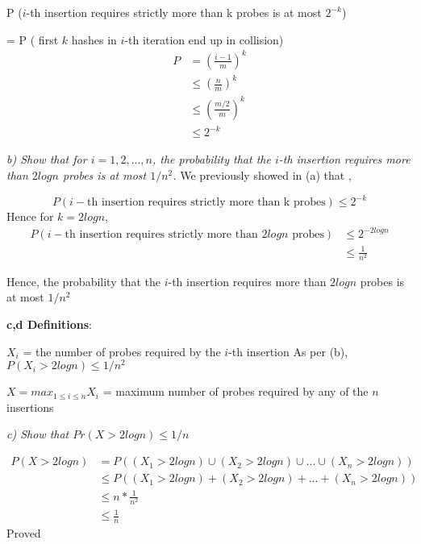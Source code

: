 \documentclass{homeworg}
\begin{document}
P ($i$-th insertion requires strictly more than k probes is at most $2^{-k}$)

= P ( first $k$ hashes in $i$-th iteration end up in collision)
\begin{align*}
P &=\left(\frac{i-1}{m}\right)^k\\
&\le \left(\frac{n}{m}\right)^k\\
&\le \left(\frac{m/2}{m}\right)^k\\
&\le 2^{-k}
\end{align*}

\emph{b) Show that for $i =1, 2,. .., n$, the probability that the $i$-th insertion requires more than $2 log n$ probes is at most $1/n^2$.}
We previously showed in (a) that ,

$$P (i-\text{th insertion requires strictly more than k probes}) \le 2^{-k}$$
Hence for $k = 2 log n$,
\begin{align*}
    P (i-\text{th insertion requires strictly more than $2 log n $ probes})&\le 2^{-2 logn}\\
    &\le \frac{1}{n^2} 
\end{align*}

Hence, the probability that the $i$-th insertion requires more than $2 log n$ probes is at most $1/n^2$


\textbf{c,d Definitions}:

$X_i$ = the number of probes required by the $i$-th insertion
As per (b), $P({X_i > 2 log n}) \le 1/n^2$ 

$X = max_{1\le i\le n} X_i$ = maximum number of probes required by any of the $n$ insertions

\emph{c) Show that $Pr({X> 2 log n}) \le 1/n$}

\begin{align*}
    P({X> 2 log n}) &= P((X_1> 2 log n) \cup (X_2> 2 log n) \cup... \cup (X_n> 2 log n)) \\
    &\le P((X_1> 2 log n) + (X_2> 2 log n) +... + (X_n> 2 log n)) \\
    &\le n \ast  \frac{1}{n^2} \\
    &\le \frac{1}{n} 
\end{align*}
Proved
\end{document}
